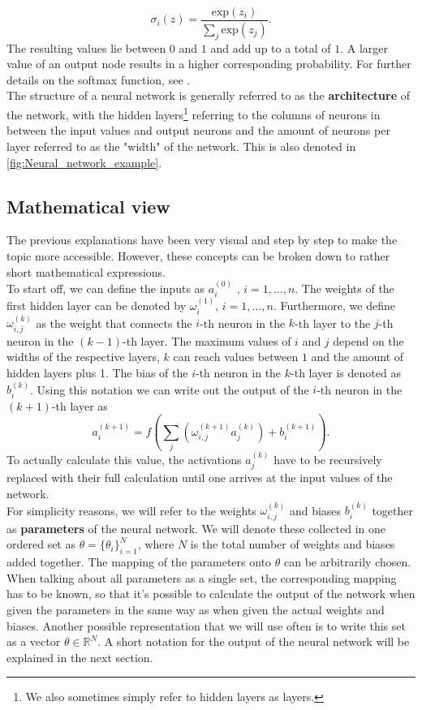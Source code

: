 \begin{equation}\label{eq:softmax}
	\sigma_i(z) = \frac{\mathrm{exp}(z_i)}{\sum_j \mathrm{exp}(z_j)}.
\end{equation}
The resulting values lie between $0$ and $1$ and add up to a total of $1$. A larger value of an output node results in a higher corresponding probability. For further details on the softmax function, see \cite{gao2018properties}.\\
The structure of a neural network is generally referred to as the \textbf{architecture} of the network, with the hidden layers\footnote{We also sometimes simply refer to hidden layers as layers.} referring to the columns of neurons in between the input values and output neurons and the amount of neurons per layer referred to as the "width" of the network. This is also denoted in \cref{fig:Neural_network_example}. 
\subsection{Mathematical view}
The previous explanations have been very visual and step by step to make the topic more accessible. However, these concepts can be broken down to rather short mathematical expressions.\\
To start off, we can define the inputs as $a_i^{(0)}$ , $i =  1, \ldots, n$. The weights of the first hidden layer can be denoted by $\omega_{i}^{(1)}$, $i =  1, \ldots, n$. Furthermore, we define $\omega_{i,j}^{(k)}$ as the weight that connects the $i$-th neuron in the $k$-th layer to the $j$-th neuron in the $(k-1)$-th layer. The maximum values of $i$ and $j$ depend on the widths of the respective layers, $k$ can reach values between $1$ and the amount of hidden layers plus 1. The bias of the $i$-th neuron in the $k$-th layer is denoted as $b_i^{(k)}$. Using this notation we can write out the output of the $i$-th neuron in the $(k+1)$-th layer as \cite{NeuralNetworksBook}
\begin{equation}
	a_i^{(k+1)} = f\left(\sum_j \left(\omega_{i,j}^{(k+1)}a_j^{(k)}\right) + b_i^{(k+1)}\right).
\end{equation}
To actually calculate this value, the activations $a_j^{(k)}$ have to be recursively replaced with their full calculation until one arrives at the input values of the network.\\
For simplicity reasons, we will refer to the weights $\omega_{i,j}^{(k)}$ and biases $b_i^{(k)}$ together as \textbf{parameters} of the neural network. We will denote these collected in one ordered set as $\theta = \{\theta_i\}_{i=1}^{N}$, where $N$ is the total number of weights and biases added together. The mapping of the parameters onto $\theta$ can be arbitrarily chosen. When talking about all parameters as a single set, the corresponding mapping has to be known, so that it's possible to calculate the output of the network when given the parameters in the same way as when given the actual weights and biases. Another possible representation that we will use often is to write this set as a vector $\theta \in \mathbb{R}^N$. A short notation for the output of the neural network will be explained in the next section.
